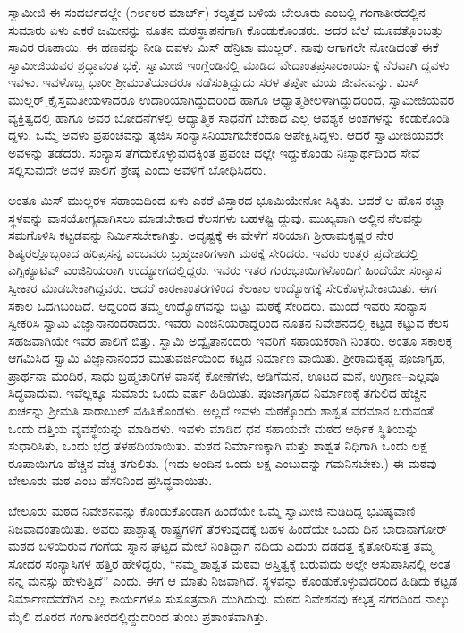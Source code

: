 ಸ್ವಾಮೀಜಿ ಈ ಸಂದರ್ಭದಲ್ಲೇ (೧೮೯೮ರ ಮಾರ್ಚ್​) ಕಲ್ಕತ್ತದ ಬಳಿಯ ಬೇಲೂರು ಎಂಬಲ್ಲಿ ಗಂಗಾತೀರದಲ್ಲಿನ ಸುಮಾರು ಏಳು ಎಕರೆ ಜಮೀನನ್ನು ನೂತನ ಮಠಸ್ಥಾಪನೆಗಾಗಿ ಕೊಂಡುಕೊಂಡರು. ಅದರ ಬೆಲೆ ಮೂವತ್ತೊಂಬತ್ತು ಸಾವಿರ ರೂಪಾಯಿ. ಈ ಹಣವನ್ನು ನೀಡಿ ದವಳು ಮಿಸ್ ಹೆನ್ರಿಟಾ ಮುಲ್ಲರ್. ನಾವು ಆಗಾಗಲೇ ನೋಡಿದಂತೆ ಈಕೆ ಸ್ವಾಮೀಜಿಯವರ ಶ್ರದ್ಧಾವಂತ ಭಕ್ತೆ. ಸ್ವಾಮೀಜಿ ಇಂಗ್ಲೆಂಡಿನಲ್ಲಿ ಮಾಡಿದ ವೇದಾಂತಪ್ರಸಾರಕಾರ್ಯಕ್ಕೆ ನೆರವಾಗಿ ದ್ದವಳು ಇವಳು. ಇವಳೊಬ್ಬ ಭಾರೀ ಶ್ರೀಮಂತೆಯಾದರೂ ನಡೆಸುತ್ತಿದ್ದುದು ಸರಳ ತಪೋ ಮಯ ಜೀವನವನ್ನು. ಮಿಸ್ ಮುಲ್ಲರ್ ಕ್ರೈಸ್ತಮತೀಯಳಾದರೂ ಉದಾರಿಯಾಗಿದ್ದುದರಿಂದ ಹಾಗೂ ಆಧ್ಯಾತ್ಮಶೀಲಳಾಗಿದ್ದುದರಿಂದ, ಸ್ವಾಮೀಜಿಯವರ ವ್ಯಕ್ತಿತ್ವದಲ್ಲಿ ಹಾಗೂ ಅವರ ಬೋಧನೆಗಳಲ್ಲಿ ಆಧ್ಯಾತ್ಮಿಕ ಸಾಧನೆಗೆ ಬೇಕಾದ ಎಲ್ಲ ಆವಶ್ಯಕ ಅಂಶಗಳನ್ನು ಕಂಡುಕೊಂಡಿ ದ್ದಳು. ಒಮ್ಮೆ ಅವಳು ಪ್ರಪಂಚವನ್ನು ತ್ಯಜಿಸಿ ಸಂನ್ಯಾಸಿನಿಯಾಗಬೇಕೆಂದೂ ಅಪೇಕ್ಷಿಸಿದ್ದಳು. ಆದರೆ ಸ್ವಾಮೀಜಿಯವರೇ ಅವಳನ್ನು ತಡೆದರು. ಸಂನ್ಯಾಸ ತೆಗೆದುಕೊಳ್ಳುವುದಕ್ಕಿಂತ ಪ್ರಪಂಚ ದಲ್ಲೇ ಇದ್ದುಕೊಂಡು ನಿಃಸ್ವಾರ್ಥದಿಂದ ಸೇವೆ ಸಲ್ಲಿಸುವುದೇ ಅವಳ ಪಾಲಿಗೆ ಶ್ರೇಷ್ಠ ಎಂದು ಅವಳಿಗೆ ಬೋಧಿಸಿದರು.

ಅಂತೂ ಮಿಸ್ ಮುಲ್ಲರಳ ಸಹಾಯದಿಂದ ಏಳು ಎಕರೆ ವಿಸ್ತಾರದ ಭೂಮಿಯೇನೋ ಸಿಕ್ಕಿತು. ಆದರೆ ಆ ಹೊಸ ಕಚ್ಚಾ ಸ್ಥಳವನ್ನು ವಾಸಯೋಗ್ಯವಾಗಿಸಲು ಮಾಡಬೇಕಾದ ಕೆಲಸಗಳು ಬಹಳಷ್ಟಿ ದ್ದುವು. ಮುಖ್ಯವಾಗಿ ಅಲ್ಲಿನ ನೆಲವನ್ನು ಸಮಗೊಳಿಸಿ ಕಟ್ಟಡವನ್ನು ನಿರ್ಮಿಸಬೇಕಾಗಿತ್ತು. ಅದೃಷ್ಟಕ್ಕೆ ಈ ವೇಳೆಗೆ ಸರಿಯಾಗಿ ಶ್ರೀರಾಮಕೃಷ್ಣರ ನೇರ ಶಿಷ್ಯರಲ್ಲೊಬ್ಬರಾದ ಹರಿಪ್ರಸನ್ನ ಎಂಬವರು ಬ್ರಹ್ಮಚಾರಿಗಳಾಗಿ ಮಠಕ್ಕೆ ಸೇರಿದರು. ಇವರು ಉತ್ತರ ಪ್ರದೇಶದಲ್ಲಿ ಎಗ್ಸಿಕ್ಯೂಟಿವ್ ಎಂಜಿನಿಯರಾಗಿ ಉದ್ಯೋಗದಲ್ಲಿದ್ದರು. ಇವರು ಇತರ ಗುರುಭಾಯಿಗಳೊಂದಿಗೆ ಹಿಂದೆಯೇ ಸಂನ್ಯಾಸ ಸ್ವೀಕಾರ ಮಾಡಬೇಕಾಗಿದ್ದವರು. ಆದರೆ ಕಾರಣಾಂತರಗಳಿಂದ ಕೆಲಕಾಲ ಉದ್ಯೋಗಕ್ಕೆ ಸೇರಿಕೊಳ್ಳಬೇಕಾಯಿತು. ಈಗ ಸಕಾಲ ಒದಗಿಬಂದಿದೆ. ಆದ್ದರಿಂದ ತಮ್ಮ ಉದ್ಯೋಗವನ್ನು ಬಿಟ್ಟು ಮಠಕ್ಕೆ ಸೇರಿದರು. ಮುಂದೆ ಇವರು ಸಂನ್ಯಾಸ ಸ್ವೀಕರಿಸಿ ಸ್ವಾಮಿ ವಿಜ್ಞಾನಾನಂದರಾದರು. ಇವರು ಎಂಜಿನಿಯರಾದ್ದರಿಂದ ನೂತನ ನಿವೇಶನದಲ್ಲಿ ಕಟ್ಟಡ ಕಟ್ಟುವ ಕೆಲಸ ಸಹಜವಾಗಿಯೇ ಇವರ ಪಾಲಿಗೆ ಬಿತ್ತು. ಸ್ವಾಮಿ ಅದ್ವೈತಾನಂದರು ಇವರಿಗೆ ಸಹಾಯಕರಾಗಿ ನಿಂತರು. ಅಂತೂ ಸಕಾಲಕ್ಕೆ ಆಗಮಿಸಿದ ಸ್ವಾಮಿ ವಿಜ್ಞಾನಾನಂದರ ಮುತುವರ್ಜಿಯಿಂದ ಕಟ್ಟಡ ನಿರ್ಮಾಣ ವಾಯಿತು. ಶ್ರೀರಾಮಕೃಷ್ಣ ಪೂಜಾಗೃಹ, ಪ್ರಾರ್ಥನಾ ಮಂದಿರ, ಸಾಧು ಬ್ರಹ್ಮಚಾರಿಗಳ ವಾಸಕ್ಕೆ ಕೋಣೆಗಳು, ಅಡಿಗೆಮನೆ, ಊಟದ ಮನೆ, ಉಗ್ರಾಣ–ಎಲ್ಲವೂ ಸಿದ್ಧವಾದುವು. ಇವೆಲ್ಲಕ್ಕೂ ಸುಮಾರು ಒಂದು ವರ್ಷ ಹಿಡಿಯಿತು. ಪೂಜಾಗೃಹದ ನಿರ್ಮಾಣಕ್ಕೆ ತಗುಲಿದ ಹೆಚ್ಚಿನ ಖರ್ಚನ್ನು ಶ್ರೀಮತಿ ಸಾರಾಬುಲ್ ವಹಿಸಿಕೊಂಡಳು. ಅಲ್ಲದೆ ಇವಳು ಮಠಕ್ಕೊಂದು ಶಾಶ್ವತ ವರಮಾನ ಬರುವಂತೆ ಒಂದು ದತ್ತಿಯ ವ್ಯವಸ್ಥೆಯನ್ನು ಮಾಡಿದಳು. ಇವಳು ಮಾಡಿದ ಧನ ಸಹಾಯವೇ ಮಠದ ಆರ್ಥಿಕ ಸ್ಥಿತಿಯನ್ನು ಸುಧಾರಿಸಿತು, ಒಂದು ಭದ್ರ ತಳಹದಿಯಾಯಿತು. ಮಠದ ನಿರ್ಮಾಣಕ್ಕಾಗಿ ಮತ್ತು ಶಾಶ್ವತ ನಿಧಿಗಾಗಿ ಒಂದು ಲಕ್ಷ ರೂಪಾಯಿಗೂ ಹೆಚ್ಚಿನ ವೆಚ್ಚ ತಗುಲಿತು. (ಇದು ಅಂದಿನ ಒಂದು ಲಕ್ಷ ಎಂಬುದನ್ನು ಗಮನಿಸಬೇಕು.) ಈ ಮಠವು ಬೇಲೂರು ಮಠ ಎಂಬ ಹೆಸರಿನಿಂದ ಪ್ರಸಿದ್ಧವಾಯಿತು.

ಬೇಲೂರು ಮಠದ ನಿವೇಶನವನ್ನು ಕೊಂಡುಕೊಂಡಾಗ ಹಿಂದೆಯೇ ಒಮ್ಮೆ ಸ್ವಾಮೀಜಿ ನುಡಿದಿದ್ದ ಭವಿಷ್ಯವಾಣಿ ನಿಜವಾದಂತಾಯಿತು. ಅವರು ಪಾಶ್ಚಾತ್ಯ ರಾಷ್ಟ್ರಗಳಿಗೆ ತೆರಳುವುದಕ್ಕೆ ಬಹಳ ಹಿಂದೆಯೇ ಒಂದು ದಿನ ಬಾರಾನಾಗೋರ್ ಮಠದ ಬಳಿಯಿರುವ ಗಂಗೆಯ ಸ್ನಾನ ಘಟ್ಟದ ಮೇಲೆ ನಿಂತಿದ್ದಾಗ ನದಿಯ ಎದುರು ದಡದತ್ತ ಕೈತೋರಿಸುತ್ತ ತಮ್ಮ ಸೋದರ ಸಂನ್ಯಾಸಿಗಳ ಹತ್ತಿರ ಹೇಳಿದ್ದರು, “ನಮ್ಮ ಶಾಶ್ವತ ಮಠವು ಅಸ್ತಿತ್ವಕ್ಕೆ ಬರುವುದು ಅಲ್ಲೇ ಆಸುಪಾಸಿನಲ್ಲಿ ಅಂತ ನನ್ನ ಮನಸ್ಸು ಹೇಳುತ್ತಿದೆ” ಎಂದು. ಈಗ ಆ ಮಾತು ನಿಜವಾಗಿದೆ. ಸ್ಥಳವನ್ನು ಕೊಂಡುಕೊಳ್ಳುವುದರಿಂದ ಹಿಡಿದು ಕಟ್ಟಡ ನಿರ್ಮಾಣದವರೆಗಿನ ಎಲ್ಲ ಕಾರ್ಯಗಳೂ ಸುಸೂತ್ರವಾಗಿ ಮುಗಿದುವು. ಮಠದ ನಿವೇಶನವು ಕಲ್ಕತ್ತ ನಗರದಿಂದ ನಾಲ್ಕು ಮೈಲಿ ದೂರದ ಗಂಗಾತೀರದಲ್ಲಿದ್ದುದರಿಂದ ತುಂಬ ಪ್ರಶಾಂತವಾಗಿತ್ತು.


